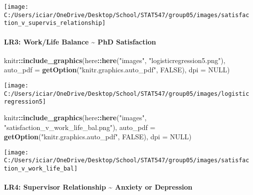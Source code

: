 \documentclass[
]{article}
\newenvironment{Shaded}{\begin{snugshade}}{\end{snugshade}}
\newcommand{\DataTypeTok}[1]{\textcolor[rgb]{0.13,0.29,0.53}{#1}}
\newcommand{\KeywordTok}[1]{\textcolor[rgb]{0.13,0.29,0.53}{\textbf{#1}}}
\newcommand{\NormalTok}[1]{#1}
\newcommand{\OperatorTok}[1]{\textcolor[rgb]{0.81,0.36,0.00}{\textbf{#1}}}
\newcommand{\OtherTok}[1]{\textcolor[rgb]{0.56,0.35,0.01}{#1}}
\newcommand{\StringTok}[1]{\textcolor[rgb]{0.31,0.60,0.02}{#1}}
\begin{document}
\texttt{[image: C:/Users/iciar/OneDrive/Desktop/School/STAT547/group05/images/satisfaction\_v\_supervis\_relationship]}

\hypertarget{lr3-worklife-balance-phd-satisfaction}{%
\paragraph{LR3: Work/Life Balance \textasciitilde{} PhD
Satisfaction}\label{lr3-worklife-balance-phd-satisfaction}}

\begin{Shaded}
\begin{Highlighting}[]
\NormalTok{knitr}\OperatorTok{::}\KeywordTok{include_graphics}\NormalTok{(here}\OperatorTok{::}\KeywordTok{here}\NormalTok{(}\StringTok{"images"}\NormalTok{, }\StringTok{"logisticregression5.png"}\NormalTok{), }\DataTypeTok{auto_pdf =} \KeywordTok{getOption}\NormalTok{(}\StringTok{"knitr.graphics.auto_pdf"}\NormalTok{, }\OtherTok{FALSE}\NormalTok{), }
    \DataTypeTok{dpi =} \OtherTok{NULL}\NormalTok{)}
\end{Highlighting}
\end{Shaded}

\texttt{[image: C:/Users/iciar/OneDrive/Desktop/School/STAT547/group05/images/logisticregression5]}

\begin{Shaded}
\begin{Highlighting}[]
\NormalTok{knitr}\OperatorTok{::}\KeywordTok{include_graphics}\NormalTok{(here}\OperatorTok{::}\KeywordTok{here}\NormalTok{(}\StringTok{"images"}\NormalTok{, }\StringTok{"satisfaction_v_work_life_bal.png"}\NormalTok{), }\DataTypeTok{auto_pdf =} \KeywordTok{getOption}\NormalTok{(}\StringTok{"knitr.graphics.auto_pdf"}\NormalTok{, }\OtherTok{FALSE}\NormalTok{), }
    \DataTypeTok{dpi =} \OtherTok{NULL}\NormalTok{)}
\end{Highlighting}
\end{Shaded}

\texttt{[image: C:/Users/iciar/OneDrive/Desktop/School/STAT547/group05/images/satisfaction\_v\_work\_life\_bal]}

\hypertarget{lr4-supervisor-relationship-anxiety-or-depression}{%
\paragraph{LR4: Supervisor Relationship \textasciitilde{} Anxiety or
Depression}\label{lr4-supervisor-relationship-anxiety-or-depression}}
\end{document}
